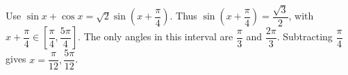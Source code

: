 Use $\sin x + \cos x = \sqrt{2} \sin (x + \dfrac{\pi}{4})$. Thus $\sin (x + \dfrac{\pi}{4}) = \dfrac{\sqrt3}{2}$, with $x + \dfrac{\pi}{4} \in [\dfrac{\pi}{4} , \dfrac{5 \pi}{4}]$. The only angles in this interval are $\dfrac{\pi}{3}$ and $\dfrac{2 \pi}{3}$. Subtracting $\dfrac{\pi}{4}$ gives $\boxed{x=\dfrac{\pi}{12},\dfrac{5\pi}{12}}$.
